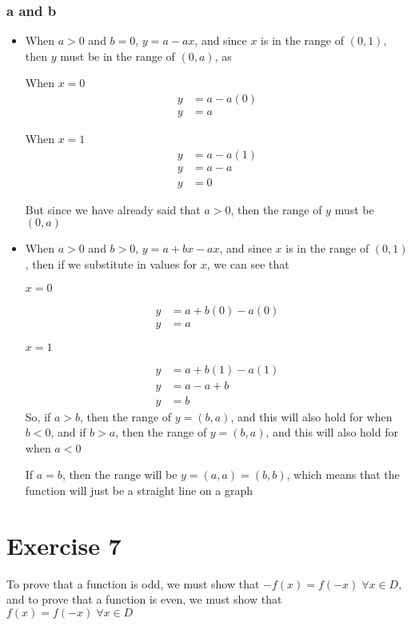 \documentclass[11pt]{article}
\begin{document}
\subsubsection*{a and b  }
\begin{itemize}
\item
When $a > 0$ and $b = 0$, $y = a - ax$, and since $x$ is in the range of $(0,1)$, then $y$ must be in the range of $(0,a)$, as

When $x = 0$
\begin{align*}
  y &= a-a(0) \\
  y &= a
\end{align*}

When $x = 1$
\begin{align*}
  y &= a-a(1)\\
  y &= a-a \\
  y &= 0
\end{align*}

But since we have already said that $a > 0$, then the range of $y$ must be $(0,a)$
 \item
        When $a > 0$ and $b > 0$, $y = a + bx - ax$, and since $x$ is in the range of $(0,1)$, then if we substitute in values for $x$, we can see that

        $x = 0$

\begin{align*}
  y &= a+b(0)-a(0) \\
  y &= a
\end{align*}

        $x = 1$

\begin{align*}
  y &= a+b(1)-a(1) \\
  y &= a-a+b \\
  y &= b
\end{align*}
        So, if $a > b$, then the range of $y = (b,a)$, and this will also hold for when $b < 0$, and if $b > a$, then the range of $y = (b,a)$, and this will also hold for when $a < 0$

        If $a = b$, then the range will be $y = (a,a) = (b,b)$, which means that the function will just be a straight line on a graph
\end{itemize}\section*{Exercise 7}
\label{sec:org19c2a8d}
To prove that a function is odd, we must show that \(-f(x)=f(-x)\; \forall x\in D\), and to prove that a function is even, we must show that \(f(x) = f(-x)\; \forall x \in D\)
\end{document}
